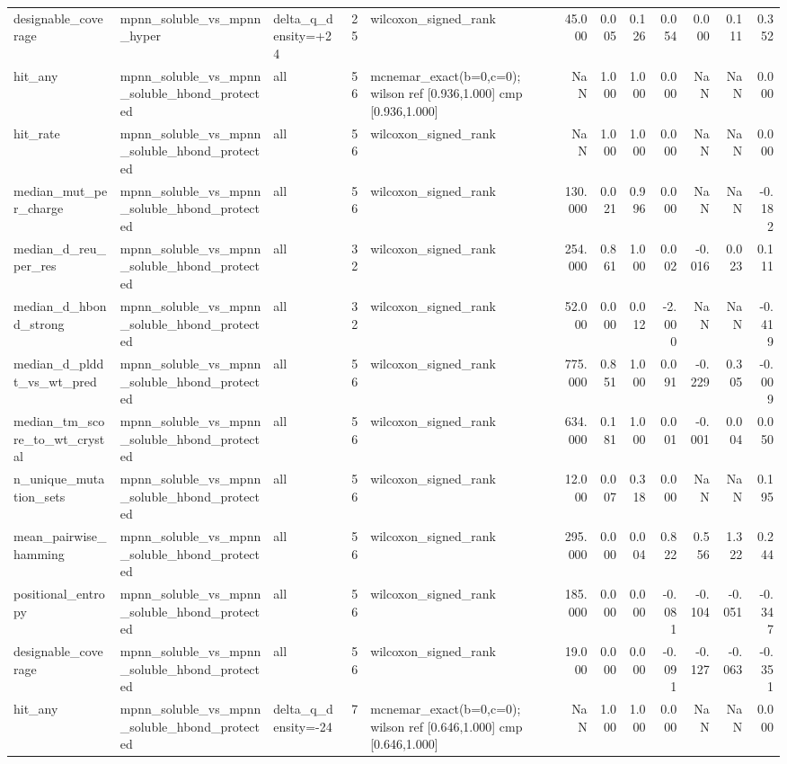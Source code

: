 \begin{table}
{\begin{tabular}{lllrlrrrrrrr}
designable\_coverage & mpnn\_soluble\_vs\_mpnn\_hyper & delta\_q\_density=+24 & 25 & wilcoxon\_signed\_rank & 45.000 & 0.005 & 0.126 & 0.054 & 0.000 & 0.111 & 0.352 \\
hit\_any & mpnn\_soluble\_vs\_mpnn\_soluble\_hbond\_protected & all & 56 & mcnemar\_exact(b=0,c=0); wilson ref [0.936,1.000] cmp [0.936,1.000] & NaN & 1.000 & 1.000 & 0.000 & NaN & NaN & 0.000 \\
hit\_rate & mpnn\_soluble\_vs\_mpnn\_soluble\_hbond\_protected & all & 56 & wilcoxon\_signed\_rank & NaN & 1.000 & 1.000 & 0.000 & NaN & NaN & 0.000 \\
median\_mut\_per\_charge & mpnn\_soluble\_vs\_mpnn\_soluble\_hbond\_protected & all & 56 & wilcoxon\_signed\_rank & 130.000 & 0.021 & 0.996 & 0.000 & NaN & NaN & -0.182 \\
median\_d\_reu\_per\_res & mpnn\_soluble\_vs\_mpnn\_soluble\_hbond\_protected & all & 32 & wilcoxon\_signed\_rank & 254.000 & 0.861 & 1.000 & 0.002 & -0.016 & 0.023 & 0.111 \\
median\_d\_hbond\_strong & mpnn\_soluble\_vs\_mpnn\_soluble\_hbond\_protected & all & 32 & wilcoxon\_signed\_rank & 52.000 & 0.000 & 0.012 & -2.000 & NaN & NaN & -0.419 \\
median\_d\_plddt\_vs\_wt\_pred & mpnn\_soluble\_vs\_mpnn\_soluble\_hbond\_protected & all & 56 & wilcoxon\_signed\_rank & 775.000 & 0.851 & 1.000 & 0.091 & -0.229 & 0.305 & -0.009 \\
median\_tm\_score\_to\_wt\_crystal & mpnn\_soluble\_vs\_mpnn\_soluble\_hbond\_protected & all & 56 & wilcoxon\_signed\_rank & 634.000 & 0.181 & 1.000 & 0.001 & -0.001 & 0.004 & 0.050 \\
n\_unique\_mutation\_sets & mpnn\_soluble\_vs\_mpnn\_soluble\_hbond\_protected & all & 56 & wilcoxon\_signed\_rank & 12.000 & 0.007 & 0.318 & 0.000 & NaN & NaN & 0.195 \\
mean\_pairwise\_hamming & mpnn\_soluble\_vs\_mpnn\_soluble\_hbond\_protected & all & 56 & wilcoxon\_signed\_rank & 295.000 & 0.000 & 0.004 & 0.822 & 0.556 & 1.322 & 0.244 \\
positional\_entropy & mpnn\_soluble\_vs\_mpnn\_soluble\_hbond\_protected & all & 56 & wilcoxon\_signed\_rank & 185.000 & 0.000 & 0.000 & -0.081 & -0.104 & -0.051 & -0.347 \\
designable\_coverage & mpnn\_soluble\_vs\_mpnn\_soluble\_hbond\_protected & all & 56 & wilcoxon\_signed\_rank & 19.000 & 0.000 & 0.000 & -0.091 & -0.127 & -0.063 & -0.351 \\
hit\_any & mpnn\_soluble\_vs\_mpnn\_soluble\_hbond\_protected & delta\_q\_density=-24 & 7 & mcnemar\_exact(b=0,c=0); wilson ref [0.646,1.000] cmp [0.646,1.000] & NaN & 1.000 & 1.000 & 0.000 & NaN & NaN & 0.000 \\

\end{tabular}}
\end{table}
